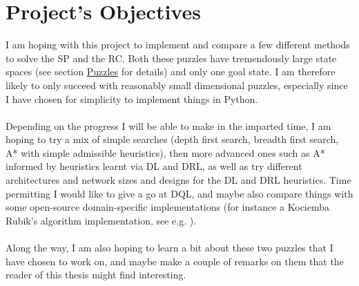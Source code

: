 
\newpage
\section{Project's Objectives}

I am hoping with this project to implement and compare a few different methods to solve the SP and the RC. Both these puzzles have tremendously large state spaces (see section \hyperref[sec:Puzzles]{Puzzles} for details) and only one goal state. I am therefore likely to only succeed with reasonably small dimensional puzzles, especially since I have chosen for simplicity to implement things in Python.
\\
\\
Depending on the progress I will be able to make in the imparted time, I am hoping to try a mix of simple searches (depth first search, breadth first search, A* with simple admissible heuristics), then more advanced ones such as A* informed by heuristics learnt via DL and DRL, as well as try different architectures and network sizes and designs for the DL and DRL heuristics. Time permitting I would like to give a go at DQL, and maybe also compare things with some open-source domain-specific implementations (for instance a Kociemba Rubik's algorithm implementation, see e.g. \cite{Kociemba}).
\\
\\
Along the way, I am also hoping to learn a bit about these two puzzles that I have chosen to work on, and maybe make a couple of remarks on them that the reader of this thesis might find interesting.
